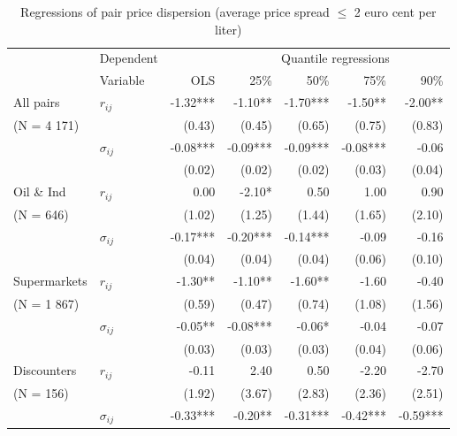 \documentclass[english]{article}
\begin{document}
\begin{table}%
\caption{Regressions of pair price dispersion (average price spread $\le$ 2 euro cent per liter)}
\label{tab:regs_pairs_robustness}
\begin{threeparttable}
    \begin{tabular}{rrrrrrr}
    \toprule
    \toprule
          & \multicolumn{1}{l}{Dependent} &       & \multicolumn{4}{c}{Quantile regressions} \\
          & \multicolumn{1}{l}{Variable} & OLS   & 25\%  & 50\%  & 75\%  & 90\% \\
    \midrule
    \multicolumn{1}{l}{All pairs} & \multicolumn{1}{l}{$r_{ij}$} & -1.32*** & -1.10** & -1.70*** & -1.50** & -2.00** \\
    \multicolumn{1}{l}{(N =  4 171)} &       & (0.43) & (0.45) & (0.65) & (0.75) & (0.83) \\
          & \multicolumn{1}{l}{$\sigma_{ij}$} & -0.08*** & -0.09*** & -0.09*** & -0.08*** & -0.06 \\
          &       & (0.02) & (0.02) & (0.02) & (0.03) & (0.04) \\
    \midrule
    \multicolumn{1}{l}{Oil \& Ind} & \multicolumn{1}{l}{$r_{ij}$} & 0.00  & -2.10* & 0.50  & 1.00  & 0.90 \\
    \multicolumn{1}{l}{ (N = 646)} &       & (1.02) & (1.25) & (1.44) & (1.65) & (2.10) \\
          & \multicolumn{1}{l}{$\sigma_{ij}$} & -0.17*** & -0.20*** & -0.14*** & -0.09 & -0.16 \\
          &       & (0.04) & (0.04) & (0.04) & (0.06) & (0.10) \\
    \midrule
    \multicolumn{1}{l}{Supermarkets} & \multicolumn{1}{l}{$r_{ij}$} & -1.30** & -1.10** & -1.60** & -1.60 & -0.40 \\
    \multicolumn{1}{l}{ (N = 1 867)} &       & (0.59) & (0.47) & (0.74) & (1.08) & (1.56) \\
          & \multicolumn{1}{l}{$\sigma_{ij}$} & -0.05** & -0.08*** & -0.06* & -0.04 & -0.07 \\
          &       & (0.03) & (0.03) & (0.03) & (0.04) & (0.06) \\
    \midrule
    \multicolumn{1}{l}{Discounters} & \multicolumn{1}{l}{$r_{ij}$} & -0.11 & 2.40  & 0.50  & -2.20 & -2.70 \\
    \multicolumn{1}{l}{ (N = 156)} &       & (1.92) & (3.67) & (2.83) & (2.36) & (2.51) \\
          & \multicolumn{1}{l}{$\sigma_{ij}$} & -0.33*** & -0.20** & -0.31*** & -0.42*** & -0.59*** \\

\end{tabular}
\end{threeparttable}
\end{table}
\end{document}
